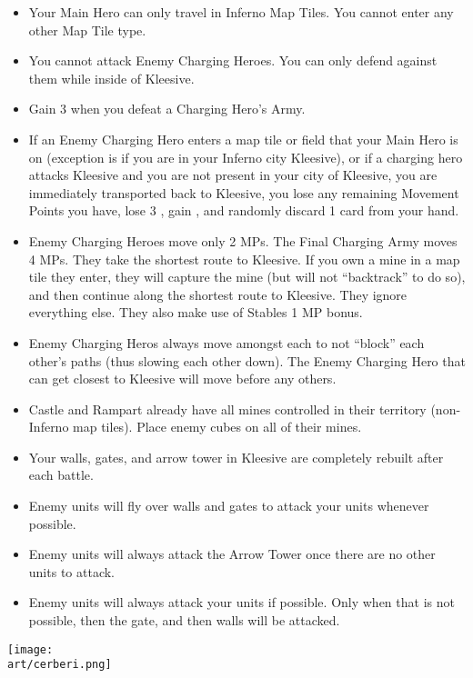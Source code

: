 \begin{multicols*}{2}
\begin{itemize}
  \item Your Main Hero can only travel in Inferno Map Tiles. You cannot enter any other Map Tile type.
  \item You cannot attack Enemy Charging Heroes. You can only defend against them while inside of Kleesive.
  \item Gain 3  when you defeat a Charging Hero's Army.
  \item If an Enemy Charging Hero enters a map tile or field that your Main Hero is on (exception is if you are in
    your Inferno city Kleesive), or if a charging hero attacks Kleesive and you are not present in your city
    of Kleesive, you are immediately transported back to Kleesive, you lose any remaining Movement Points
    you have, lose 3 , gain , and randomly discard 1 card from your hand.
  \item Enemy Charging Heroes move only 2 MPs. The Final Charging Army moves 4 MPs. They take the shortest
    route to Kleesive. If you own a mine in a map tile they enter, they will capture the mine (but will not
    ``backtrack'' to do so), and then continue along the shortest route to Kleesive. They ignore everything
    else. They also make use of Stables 1 MP bonus.
  \item Enemy Charging Heros always move amongst each to not ``block'' each other's paths (thus slowing each
    other down). The Enemy Charging Hero that can get closest to Kleesive will move before any others.
  \item Castle and Rampart already have all mines controlled in their territory (non-Inferno map tiles). Place enemy
    cubes on all of their mines.
  \item Your walls, gates, and arrow tower in Kleesive are completely rebuilt after each battle.
  \item Enemy  units will fly over walls and gates to attack your units whenever possible.
  \item Enemy  units will always attack the Arrow Tower once there are no other  units to attack.
  \item Enemy units will always attack your units if possible. Only when that is not possible, then the gate,
    and then walls will be attacked.
\end{itemize}

\vspace*{\fill}
\texttt{[image: \\art/cerberi.png]}
\vspace*{\fill}

\end{multicols*}

